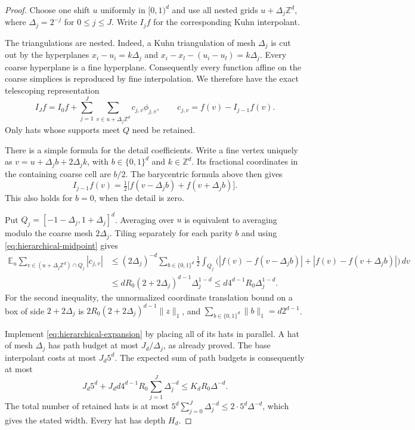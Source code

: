 \begin{proof}
Choose one shift $u$ uniformly in $[0,1)^d$ and use all nested grids $u+\Delta_j\mathbb Z^d$, where $\Delta_j=2^{-j}$ for $0\le j\le J$. Write $I_jf$ for the corresponding Kuhn interpolant.

The triangulations are nested. Indeed, a Kuhn triangulation of mesh $\Delta_j$ is cut out by the hyperplanes $x_i-u_i=k\Delta_j$ and $x_i-x_l-(u_i-u_l)=k\Delta_j$. Every coarse hyperplane is a fine hyperplane. Consequently every function affine on the coarse simplices is reproduced by fine interpolation. We therefore have the exact telescoping representation
\begin{equation}
 I_Jf=I_0f+\sum_{j=1}^J\sum_{v\in u+\Delta_j\mathbb Z^d}
       c_{j,v}\phi_{j,v},\qquad
 c_{j,v}=f(v)-I_{j-1}f(v).
 \label{eq:hierarchical-expansion}
\end{equation}
Only hats whose supports meet $Q$ need be retained.

There is a simple formula for the detail coefficients. Write a fine vertex uniquely as
$v=u+\Delta_jb+2\Delta_j k$, with $b\in\{0,1\}^d$ and $k\in\mathbb Z^d$. Its fractional coordinates in the containing coarse cell are $b/2$. The barycentric formula above then gives
\begin{equation}
 I_{j-1}f(v)=\tfrac12\bigl[f(v-\Delta_j b)+f(v+\Delta_j b)\bigr].
 \label{eq:hierarchical-midpoint}
\end{equation}
This also holds for $b=0$, when the detail is zero.

Put $Q_j=[-1-\Delta_j,1+\Delta_j]^d$. Averaging over $u$ is equivalent to averaging modulo the coarse mesh $2\Delta_j$. Tiling separately for each parity $b$ and using \eqref{eq:hierarchical-midpoint} gives
\begin{align*}
 \mathbb E_u\sum_{v\in (u+\Delta_j\mathbb Z^d)\cap Q_j}|c_{j,v}|
 &\le(2\Delta_j)^{-d}\sum_{b\in\{0,1\}^d}
 \frac12\int_{Q_j}\bigl(
 |f(v)-f(v-\Delta_j b)|+|f(v)-f(v+\Delta_j b)|\bigr)\,dv\\
 &\le dR_0(2+2\Delta_j)^{d-1}\Delta_j^{1-d}
 \le d4^{d-1}R_0\Delta_j^{1-d}.
\end{align*}
For the second inequality, the unnormalized coordinate translation bound on a box of side $2+2\Delta_j$ is
$2R_0(2+2\Delta_j)^{d-1}\|z\|_1$, and
$\sum_{b\in\{0,1\}^d}\|b\|_1=d2^{d-1}$.

Implement \eqref{eq:hierarchical-expansion} by placing all of its hats in parallel. A hat of mesh $\Delta_j$ has path budget at most $J_d/\Delta_j$, as already proved. The base interpolant costs at most $J_d5^d$. The expected sum of path budgets is consequently at most
\[
 J_d5^d+J_dd4^{d-1}R_0\sum_{j=1}^J\Delta_j^{-d}
 \le K_dR_0\Delta^{-d}.
\]
The total number of retained hats is at most
$5^d\sum_{j=0}^J\Delta_j^{-d}\le2\cdot5^d\Delta^{-d}$, which gives the stated width. Every hat has depth $H_d$.


\end{proof}
